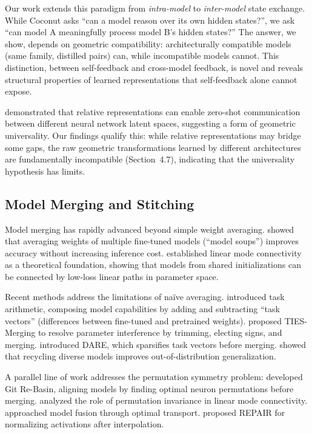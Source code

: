 \documentclass[10pt]{article} %
\theoremstyle{plain}
\theoremstyle{definition}
\theoremstyle{remark}
\begin{document}
Our work extends this paradigm from \textit{intra-model} to \textit{inter-model} state exchange. While Coconut asks ``can a model reason over its own hidden states?'', we ask ``can model A meaningfully process model B's hidden states?'' The answer, we show, depends on geometric compatibility: architecturally compatible models (same family, distilled pairs) can, while incompatible models cannot. This distinction, between self-feedback and cross-model feedback, is novel and reveals structural properties of learned representations that self-feedback alone cannot expose.

\citet{moschella2023relative} demonstrated that relative representations can enable zero-shot communication between different neural network latent spaces, suggesting a form of geometric universality. Our findings qualify this: while relative representations may bridge some gaps, the raw geometric transformations learned by different architectures are fundamentally incompatible (Section~4.7), indicating that the universality hypothesis has limits.

\subsection{Model Merging and Stitching}

Model merging has rapidly advanced beyond simple weight averaging. \citet{wortsman2022model} showed that averaging weights of multiple fine-tuned models (``model soups'') improves accuracy without increasing inference cost. \citet{frankle2020linear} established linear mode connectivity as a theoretical foundation, showing that models from shared initializations can be connected by low-loss linear paths in parameter space.

Recent methods address the limitations of na\"ive averaging. \citet{ilharco2023task} introduced task arithmetic, composing model capabilities by adding and subtracting ``task vectors'' (differences between fine-tuned and pretrained weights). \citet{yadav2023ties} proposed TIES-Merging to resolve parameter interference by trimming, electing signs, and merging. \citet{yu2024dare} introduced DARE, which sparsifies task vectors before merging. \citet{davari2023model} showed that recycling diverse models improves out-of-distribution generalization.

A parallel line of work addresses the permutation symmetry problem: \citet{ainsworth2023git} developed Git Re-Basin, aligning models by finding optimal neuron permutations before merging. \citet{entezari2022role} analyzed the role of permutation invariance in linear mode connectivity. \citet{singh2020model} approached model fusion through optimal transport. \citet{jordan2023repair} proposed REPAIR for normalizing activations after interpolation.
\end{document}
